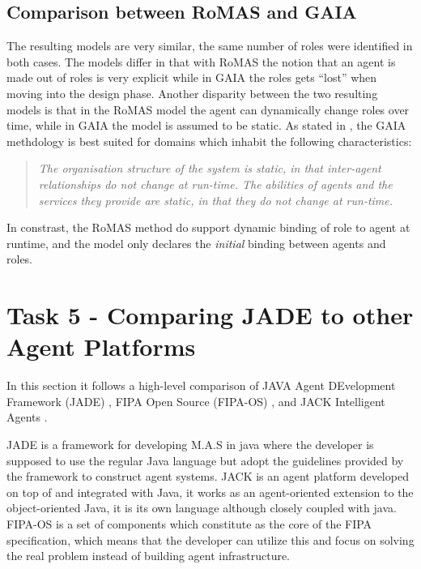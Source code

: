 \documentclass[paper=letter, fontsize=12pt]{article}
\begin{document}
\subsection{Comparison between RoMAS and GAIA}
The resulting models are very similar, the same number of roles were identified in both cases. The models differ in that with RoMAS the notion that an agent is made out of roles is very explicit while in GAIA the roles gets ``lost'' when moving into the design phase. Another disparity between the two resulting models is that in the RoMAS model the agent can dynamically change roles over time, while in GAIA the model is assumed to be static. As stated in \citep{wooldrigde_jennings}, the GAIA methdology is best suited for domains which inhabit the following characteristics:
\begin{quote}
\textit{The organisation structure of the system is static, in that inter-agent relationships do not change at run-time. The abilities of agents and the services they provide are static, in that they do not change at run-time.}\citep{wooldrigde_jennings}
\end{quote}
In constrast, the RoMAS method do support dynamic binding of role to agent at runtime, and the model only declares the \textit{initial} binding between agents and roles.
\section{Task 5 - Comparing JADE to other Agent Platforms}
In this section it follows a high-level comparison of JAVA Agent DEvelopment Framework (JADE) \citep{jade}, FIPA Open Source (FIPA-OS) \citep{fipaos}, and JACK Intelligent Agents \citep{jack}. 

JADE is a framework for developing M.A.S in java where the developer is supposed to use the regular Java language but adopt the guidelines provided by the framework to construct agent systems. JACK is an agent platform developed on top of and integrated with Java, it works as an agent-oriented extension to the object-oriented Java, it is its own language although closely coupled with java. FIPA-OS is a set of components which constitute as the core of the FIPA specification, which means that the developer can utilize this and focus on solving the real problem instead of building agent infrastructure.
\end{document}
